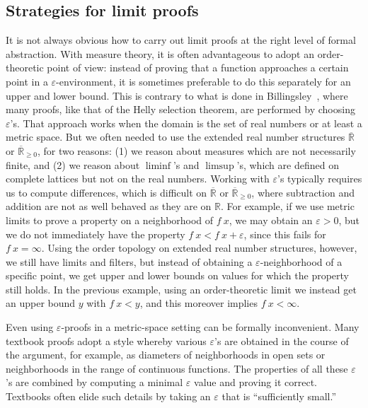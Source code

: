 \documentclass{svjour3}
\newcommand{\RR}{\mathbb{R}}
\newcommand{\ennRR}{\overline{\mathbb{R}}_{\ge 0}}
\newcommand{\eRR}{\overline{\mathbb{R}}}
\begin{document}
\subsection{Strategies for limit proofs}

It is not always obvious how to carry out limit proofs at the right level of formal abstraction. With measure theory, it is often advantageous to adopt an order-theoretic point of view: instead of proving that a function approaches a certain point in a $\varepsilon$-environment, it is sometimes preferable to do this separately for an upper and lower bound. This is contrary to what is done in Billingsley~\cite{billingsley:95}, where many proofs, like that of the Helly selection theorem, are performed by choosing $\varepsilon$'s. That approach works when the domain is the set of real numbers or at least a metric space. But we often needed to use the extended real number structures $\eRR$ or $\ennRR$, for two reasons: (1) we reason about measures which are not necessarily finite, and (2) we reason about $\liminf$'s and $\limsup$'s, which are defined on complete lattices but not on the real numbers. Working with $\varepsilon$'s typically requires us to compute differences, which is difficult on $\eRR$ or $\ennRR$, where subtraction and addition are not as well behaved as they are on $\RR$. For example, if we use metric limits to prove a property on a neighborhood of $f~x$, we may obtain an $\varepsilon > 0$, but we do not immediately have the property $f~x < f~x + \varepsilon$, since this fails for $f~x = \infty$. Using the order topology on extended real number structures, however, we still have limits and filters, but instead of obtaining a $\varepsilon$-neighborhood of a specific point, we get upper and lower bounds on values for which the property still holds. In the previous example, using an order-theoretic limit we instead get an upper bound $y$ with $f~x < y$, and this moreover implies $f~x < \infty$.

Even using $\varepsilon$-proofs in a metric-space setting can be formally inconvenient. Many textbook proofs adopt a style whereby various $\varepsilon$'s are obtained in the course of the argument, for example, as diameters of neighborhoods in open sets or neighborhoods in the range of continuous functions. The properties of all these $\varepsilon$'s are combined by computing a minimal $\varepsilon$ value and proving it correct. Textbooks often elide such details by taking an $\varepsilon$ that is ``sufficiently small.''
\end{document}
